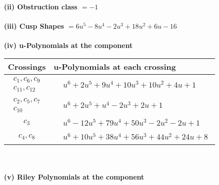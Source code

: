 \documentclass[1p]{elsarticle_modified}
\theoremstyle{definition}
\begin{document}
\flushleft \textbf{(ii) Obstruction class $= -1$}\\~\\
\flushleft \textbf{(iii) Cusp Shapes $= 6 u^5-8 u^4-2 u^3+18 u^2+6 u-16$}\\~\\
\newpage\renewcommand{\arraystretch}{1}
\flushleft \textbf{(iv) u-Polynomials at the component}\newline \\
\begin{tabular}{m{50pt}|m{274pt}}
Crossings & \hspace{64pt}u-Polynomials at each crossing \\
\hline $$\begin{aligned}c_{1},c_{6},c_{9}\\c_{11},c_{12}\end{aligned}$$&$\begin{aligned}
&u^6+2 u^5+9 u^4+10 u^3+10 u^2+4 u+1
\end{aligned}$\\
\hline $$\begin{aligned}c_{2},c_{5},c_{7}\\c_{10}\end{aligned}$$&$\begin{aligned}
&u^6+2 u^5+u^4-2 u^3+2 u+1
\end{aligned}$\\
\hline $$\begin{aligned}c_{3}\end{aligned}$$&$\begin{aligned}
&u^6-12 u^5+79 u^4+50 u^3-2 u^2-2 u+1
\end{aligned}$\\
\hline $$\begin{aligned}c_{4},c_{8}\end{aligned}$$&$\begin{aligned}
&u^6+10 u^5+38 u^4+56 u^3+44 u^2+24 u+8
\end{aligned}$\\
\hline
\end{tabular}\\~\\
\newpage\renewcommand{\arraystretch}{1}
\flushleft \textbf{(v) Riley Polynomials at the component}\newline \\
\end{document}
